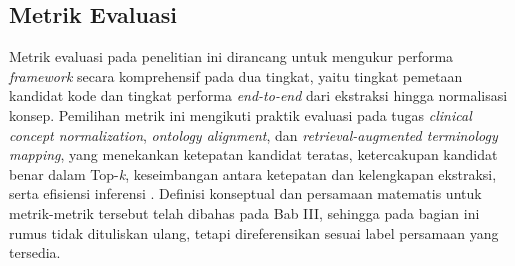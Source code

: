 \subsection{Metrik Evaluasi}

Metrik evaluasi pada penelitian ini dirancang untuk mengukur performa \textit{framework} secara komprehensif pada dua tingkat, yaitu tingkat pemetaan kandidat kode dan tingkat performa \textit{end-to-end} dari ekstraksi hingga normalisasi konsep. Pemilihan metrik ini mengikuti praktik evaluasi pada tugas \textit{clinical concept normalization}, \textit{ontology alignment}, dan \textit{retrieval-augmented terminology mapping}, yang menekankan ketepatan kandidat teratas, ketercakupan kandidat benar dalam Top-\textit{k}, keseimbangan antara ketepatan dan kelengkapan ekstraksi, serta efisiensi inferensi \citep{chen_clinical_2020,he_bertmap_2022,gilani_cde-mapper_2025,park_development_2026,yu_large_2026}. Definisi konseptual dan persamaan matematis untuk metrik-metrik tersebut telah dibahas pada Bab III, sehingga pada bagian ini rumus tidak dituliskan ulang, tetapi direferensikan sesuai label persamaan yang tersedia.

